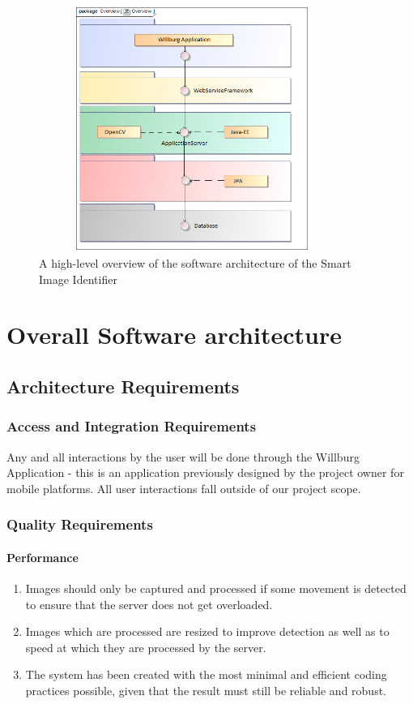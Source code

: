 \documentclass[a4paper,12pt]{report}
\begin{document}
	\begin{figure}[htb]
		\centering
		\includegraphics [height= 8cm, width=10cm]{../Diagrams/SystemOverview.png}
		\caption{A high-level overview of the software architecture of the Smart Image Identifier}
	\end{figure}


\section {Overall Software architecture}	
\subsection{Architecture Requirements}
\subsubsection{Access and Integration Requirements}
Any and all interactions by the user will be done through the Willburg Application - this is an application previously designed by the project owner for mobile platforms. All user interactions fall outside of our project scope. 
\subsubsection{Quality Requirements}
\paragraph{Performance}
\begin{enumerate}
	\item Images should only be captured and processed if some movement is detected to ensure that the server does not get overloaded.
	\item Images which are processed are resized to improve detection as well as to speed at which they are processed by the server.
	\item The system has been created with the most minimal and efficient coding practices possible, given that the result must still be reliable and robust.
\end{enumerate}
\end{document}
